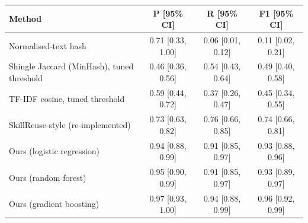 \begin{tabular}{lccc}
\toprule
Method & P [95\% CI] & R [95\% CI] & F1 [95\% CI] \\
\midrule
Normalised-text hash & 0.71 [0.33, 1.00] & 0.06 [0.01, 0.12] & 0.11 [0.02, 0.21] \\
Shingle Jaccard (MinHash), tuned threshold & 0.46 [0.36, 0.56] & 0.54 [0.43, 0.64] & 0.49 [0.40, 0.58] \\
TF-IDF cosine, tuned threshold & 0.59 [0.44, 0.72] & 0.37 [0.26, 0.47] & 0.45 [0.34, 0.55] \\
SkillReuse-style (re-implemented) & 0.73 [0.63, 0.82] & 0.76 [0.66, 0.85] & 0.74 [0.66, 0.81] \\
\midrule
Ours (logistic regression) & 0.94 [0.88, 0.99] & 0.91 [0.85, 0.97] & 0.93 [0.88, 0.96] \\
Ours (random forest) & 0.95 [0.90, 0.99] & 0.91 [0.85, 0.97] & 0.93 [0.89, 0.97] \\
Ours (gradient boosting) & 0.97 [0.93, 1.00] & 0.94 [0.88, 0.99] & 0.96 [0.92, 0.99] \\
\bottomrule
\end{tabular}

